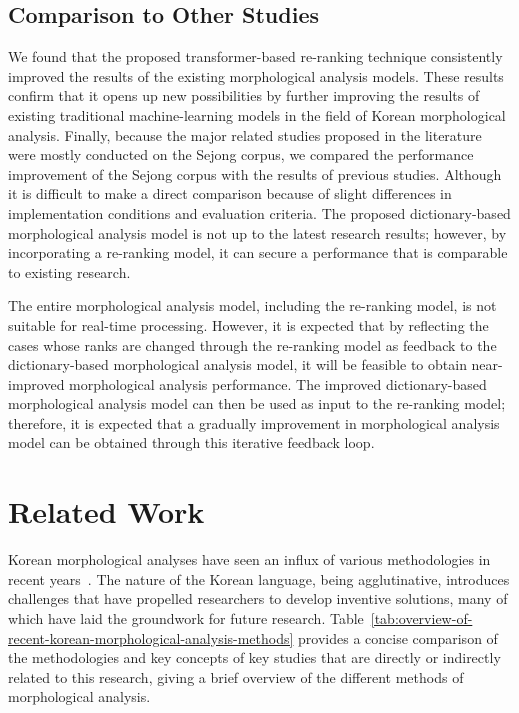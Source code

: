 \documentclass[AMS,STIX2COL]{WileyNJD-v2}
\begin{document}
    \subsection{Comparison to Other Studies}\label{subsec:comparison-to-other-studies}

    We found that the proposed transformer-based re-ranking technique consistently improved the results of the existing morphological analysis models.
    These results confirm that it opens up new possibilities by further improving the results of existing traditional machine-learning models in the field of Korean morphological analysis.
    Finally, because the major related studies proposed in the literature were mostly conducted on the Sejong corpus, we compared the performance improvement of the Sejong corpus with the results of previous studies.
    Although it is difficult to make a direct comparison because of slight differences in implementation conditions and evaluation criteria.
    The proposed dictionary-based morphological analysis model is not up to the latest research results; however, by incorporating a re-ranking model, it can secure a performance that is comparable to existing research.

    The entire morphological analysis model, including the re-ranking model, is not suitable for real-time processing.
    However, it is expected that by reflecting the cases whose ranks are changed through the re-ranking model as feedback to the dictionary-based morphological analysis model, it will be feasible to obtain near-improved morphological analysis performance.
    The improved dictionary-based morphological analysis model can then be used as input to the re-ranking model; therefore, it is expected that a gradually improvement in morphological analysis model can be obtained through this iterative feedback loop.


    \section{Related Work}\label{sec:related-work}

    Korean morphological analyses have seen an influx of various methodologies in recent years~\cite{KwonHC1991, LeeDG2009, ShimKS2011, LeeJS2011, ShinJC2012, LeeCK2013, NaSH2014, NaSH2015, HwangHS2016, KimHM2016, ChungES2016, LeeCH2016, Li2017, NaSH2018, KimSW2018, ChoiYS2018, MinJW2018, MinJW2019, KimHM2019, SongHJ2019, MinJW2020, SongHJ2020, ChoiYS2020, HwangHS2020, KimHJ2021, YounJY2021, MinJW2022, KimJM2022, ShinHJ2023}.
    The nature of the Korean language, being agglutinative, introduces challenges that have propelled researchers to develop inventive solutions, many of which have laid the groundwork for future research.
    Table~\ref{tab:overview-of-recent-korean-morphological-analysis-methods} provides a concise comparison of the methodologies and key concepts of key studies that are directly or indirectly related to this research, giving a brief overview of the different methods of morphological analysis.
\end{document}

